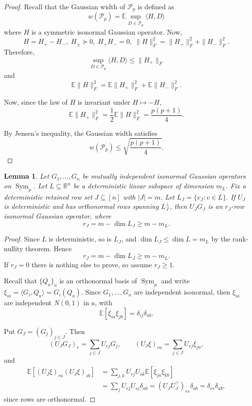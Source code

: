 \documentclass[11pt]{article}
\numberwithin{equation}{section}
\newtheorem{lemma}[theorem]{Lemma}
\theoremstyle{definition}
\theoremstyle{remark}
\newcommand{\E}{\mathbb E}
\newcommand{\1}{\boldsymbol 1}
\begin{document}
\begin{aiblock}
\begin{proof}
    Recall that the Gaussian width of $\mathcal P_p$ is defined as
    \[
        w(\mathcal P_p) = \E \sup_{D \in \mathcal P_p} \langle H, D \rangle
    \]
    where $H$ is a symmetric isonormal Gaussian operator.
    Now,
    \[
        H = H_{+} - H_{-},\;
        H_{\pm} \succeq 0,\;
        H_{+} H_{-} = 0,\;
        \|H\|_{F}^{2} = \|H_{+}\|_{F}^{2} + \|H_{-}\|_{F}^{2}.
    \]
    Therefore,
    \[
        \sup_{D \in \mathcal P_p} \langle H, D \rangle \le \|H_+\|_F
    \]
    and 
    \[
        \E\|H\|_{F}^{2} = \E\|H_{+}\|_{F}^{2} + 
        \E\|H_{-}\|_{F}^{2}.
    \]
    
    Now, since the law of $H$ is invariant under $H \mapsto -H$,
    \[
    \E\|H_+\|_F^2=\frac12\E\|H\|_F^2=\frac{p(p+1)}4.
    \]
    
    By Jensen's inequality, the Gaussian width satisfies
    \[
    w(\mathcal P_p) \le \sqrt{\frac{p (p + 1)}{4}}.
    \]

\end{proof}


\begin{lemma} \label{lem:infeasibility_above:projected_rows}
    Let $G_1, \dots, G_n$ be mutually independent isonormal Gaussian operators on $\operatorname{Sym}_p$.
    Let $L \subseteq \mathbb R^n$ be a deterministic linear subspace of dimension $m_L$.
    Fix a deterministic retained row set $J \subseteq [n]$ with $|J| = m$. Let $L_J = \{v_J : v \in L\}$.
    If $U_J$ is deterministic and has orthonormal rows spanning $L_J^\perp$, then $U_J G_J$ is an $r_J$-row isonormal Gaussian operator, where
    \[
        r_J = m - \dim L_J \ge m - m_L.
    \]
\end{lemma}

\begin{proof}
    Since $L$ is deterministic, so is $L_J$, and $\dim L_J \le \dim L = m_L$ by the rank-nullity theorem.
    Hence
    \[
        r_J = m - \dim L_J \ge m - m_L.
    \]
    If $r_J = 0$ there is nothing else to prove, so assume $r_J \geq 1$.
    
    Recall that $\{Q_a\}_a$ is an orthonormal basis of $\operatorname{Sym}_p$ and write $\xi_{ia} = \langle G_i, Q_a\rangle = G_i(Q_a)$.
    Since $G_1, \dots, G_n$ are independent isonormal, then $\xi_{ia}$ are independent $N(0, 1)$ in $a$, with
    \[
        \E[\xi_{ia} \xi_{jb}] = \delta_{ij} \delta_{ab}.
    \]
    
    Put $G_J = (G_j)_{j \in J}$. Then
    \[
        (U_J G_J)_r = \sum_{j \in J} U_{rj} G_j,
        \qquad
        (U_J \xi)_{ra} = \sum_{j \in J} U_{rj} \xi_{ja},
    \]
    and
    \begin{align*}
        \E[(U_J \xi)_{ra} (U_J \xi)_{sb}] &=\sum_{j, k} U_{rj} U_{sk} \E[\xi_{ja} \xi_{kb}] \\
        &=\sum_j U_{rj} U_{sj} \delta_{ab} = (U_J U_J^\top)_{rs} \delta_{ab} = \delta_{rs}\delta_{ab},
    \end{align*}
    since rows are orthonormal.
    

\end{proof}
\end{aiblock}
\end{document}
